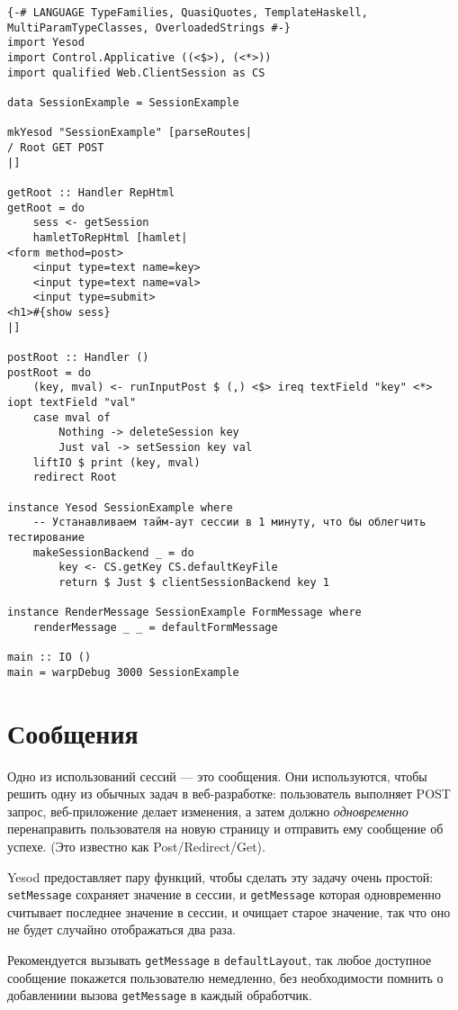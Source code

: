 \begin{lstlisting}
{-# LANGUAGE TypeFamilies, QuasiQuotes, TemplateHaskell, MultiParamTypeClasses, OverloadedStrings #-}
import Yesod
import Control.Applicative ((<$>), (<*>))
import qualified Web.ClientSession as CS

data SessionExample = SessionExample

mkYesod "SessionExample" [parseRoutes|
/ Root GET POST
|]

getRoot :: Handler RepHtml
getRoot = do
    sess <- getSession
    hamletToRepHtml [hamlet|
<form method=post>
    <input type=text name=key>
    <input type=text name=val>
    <input type=submit>
<h1>#{show sess}
|]

postRoot :: Handler ()
postRoot = do
    (key, mval) <- runInputPost $ (,) <$> ireq textField "key" <*> iopt textField "val"
    case mval of
        Nothing -> deleteSession key
        Just val -> setSession key val
    liftIO $ print (key, mval)
    redirect Root

instance Yesod SessionExample where
    -- Устанавливаем тайм-аут сессии в 1 минуту, что бы облегчить тестирование
    makeSessionBackend _ = do
        key <- CS.getKey CS.defaultKeyFile
        return $ Just $ clientSessionBackend key 1

instance RenderMessage SessionExample FormMessage where
    renderMessage _ _ = defaultFormMessage

main :: IO ()
main = warpDebug 3000 SessionExample
\end{lstlisting}

\section{Сообщения}

Одно из использований сессий --- это сообщения. Они используются, чтобы решить одну из обычных задач в веб-разработке: пользователь выполняет POST запрос, веб-приложение делает изменения, а затем должно \emph{одновременно} перенаправить пользователя на новую страницу и отправить ему сообщение об успехе. (Это известно как Post/Redirect/Get).

Yesod предоставляет пару функций, чтобы сделать эту задачу очень простой: \lstinline'setMessage' сохраняет значение в сессии, и \lstinline'getMessage' которая одновременно считывает последнее значение в сессии, и очищает старое значение, так что оно не будет случайно отображаться два раза. 

Рекомендуется вызывать \lstinline'getMessage' в \lstinline'defaultLayout', так любое доступное сообщение покажется пользователю немедленно, без необходимости помнить о добавлениии вызова \lstinline'getMessage' в каждый обработчик. 

